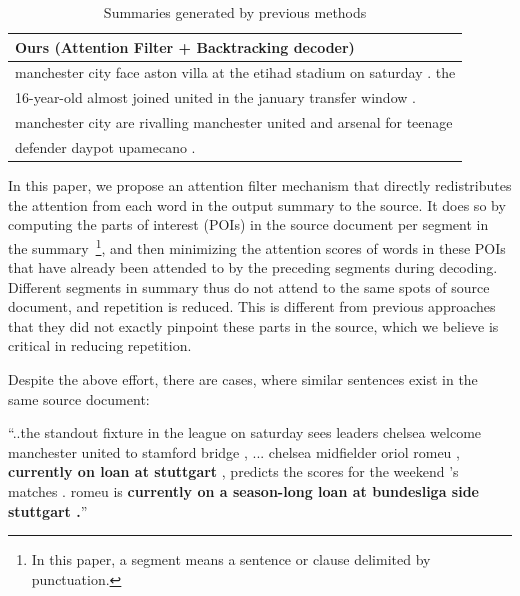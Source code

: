 \begin{table}[th]
\begin{center}
\begin{tabular}{|l|}
\hline \bf Ours (Attention Filter + Backtracking decoder) \\
\hline manchester city face aston villa at the etihad stadium on saturday . the \\
       16-year-old almost joined united in the january transfer window . \\
	   manchester city are rivalling manchester united and arsenal for teenage \\
	   defender daypot upamecano .\\
\hline
\end{tabular}
\end{center}
\caption{\label{tab:strong_methods} Summaries generated by previous methods}
\end{table}

In this paper, we propose an attention filter mechanism that directly 
redistributes the attention from each word in the output summary to the source. 
It does so by computing the parts of interest (POIs) in the source document
per segment in the summary~\footnote{In this paper, a segment means 
a sentence or clause delimited by punctuation.}, and then minimizing the attention scores of
words in these POIs that have already been attended to by the preceding 
segments during decoding. 
Different segments in summary thus do not attend to the same spots
of source document, and repetition is reduced. 
This is different from previous approaches
that they did not exactly pinpoint these parts in the source,
which we believe is critical in reducing repetition. 

Despite the above effort, there are cases, where similar sentences 
exist in the same source document:
\begin{example}
\label{ex:repeatsrc}
\small{``..the standout fixture in the league on saturday sees leaders 
	   chelsea welcome manchester united to stamford bridge , ... 
	   chelsea midfielder oriol romeu , 
\textbf{currently on loan at stuttgart} , predicts 
the scores for the weekend 's matches . romeu is \textbf{currently on a season-long 
loan at bundesliga side stuttgart .}''} 
\end{example}

